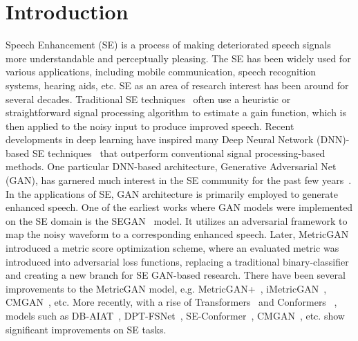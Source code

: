 \documentclass{article}
\begin{document}
\section{Introduction}\label{sec:introduction}
Speech Enhancement (SE) is a process of making deteriorated speech signals more understandable and perceptually pleasing. The SE has been widely used for various applications, including mobile communication, speech recognition systems, hearing aids, etc. SE as an area of research interest has been around for several decades. Traditional SE techniques~\cite{1163209, 1163086} often use a heuristic or straightforward signal processing algorithm to estimate a gain function, which is then applied to the noisy input to produce improved speech. Recent developments in deep learning have inspired many Deep Neural Network (DNN)-based SE techniques~\cite{9054563, tran2020single, https://doi.org/10.48550/arxiv.1703.09452, pmlr-v97-fu19b, Wisdom2019DifferentiableCC} that outperform conventional signal processing-based methods. One particular DNN-based architecture, Generative Adversarial Net (GAN), has garnered much interest in the SE community for the past few years~\cite{https://doi.org/10.48550/arxiv.1703.09452, pmlr-v97-fu19b, fu2021metricgan+, cao2022cmgan}. In the applications of SE, GAN architecture is primarily employed to generate enhanced speech. One of the earliest works where GAN models were implemented on the SE domain is the SEGAN~\cite{https://doi.org/10.48550/arxiv.1703.09452} model. It utilizes an adversarial framework to map the noisy waveform to a corresponding enhanced speech. Later, MetricGAN~\cite{pmlr-v97-fu19b} introduced a metric score optimization scheme, where an evaluated metric was introduced into adversarial loss functions, replacing a traditional binary-classifier~\cite{https://doi.org/10.48550/arxiv.1703.09452} and creating a new branch for SE GAN-based research. There have been several improvements to the MetricGAN model, e.g. MetricGAN+~\cite{fu2021metricgan+}, iMetricGAN~\cite{Li2020iMetricGANIE}, CMGAN~\cite{cao2022cmgan}, etc. More recently, with a rise of Transformers~\cite{NIPS2017_3f5ee243} and Conformers ~\cite{Gulati2020ConformerCT}, models such as DB-AIAT~\cite{9746273}, DPT-FSNet~\cite{9746171}, SE-Conformer~\cite{kim21h_interspeech}, CMGAN~\cite{cao2022cmgan}, etc. show significant improvements on SE tasks.
\end{document}
